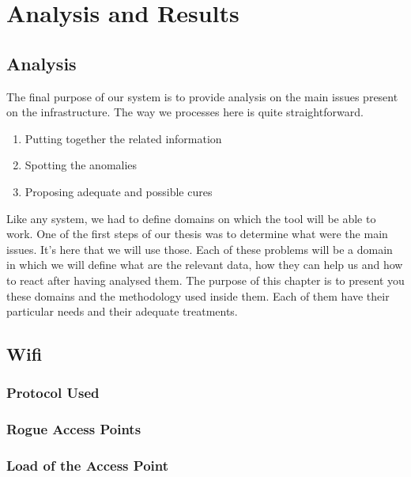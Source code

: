 
\chapter{Analysis and Results} %

\label{Chapter6} %


\section{Analysis}
The final purpose of our system is to provide analysis on the main issues present on the infrastructure. The way we processes here is quite straightforward.

\begin{enumerate}
\item Putting together the related information
\item Spotting the anomalies
\item Proposing adequate and possible cures
\end{enumerate}

Like any system, we had to define domains on which the tool will be able to work. One of the first steps of our thesis was to determine what were the main issues. It's here that we will use those. Each of these problems will be a domain in which we will define what are the relevant data, how they can help us and how to react after having analysed them. The purpose of this chapter is to present you these domains and the methodology used inside them. Each of them have their particular needs and their adequate treatments.

\section{Wifi}
\subsection{Protocol Used}
\subsection{Rogue Access Points}
\subsection{Load of the Access Point}
